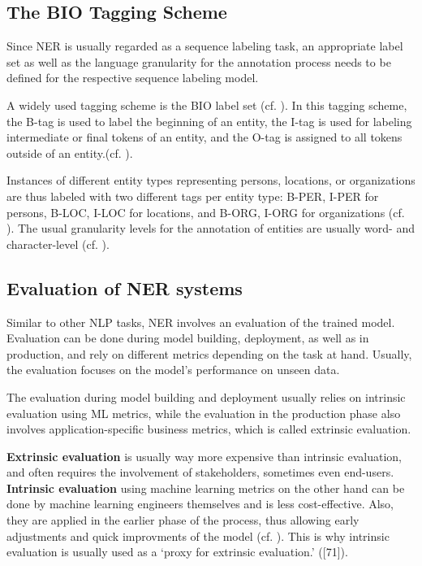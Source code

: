 \subsection{The BIO Tagging Scheme}
Since NER is usually regarded as a sequence labeling task, an appropriate label set as well as the language granularity for the annotation process needs to be defined for the respective sequence labeling model. 

A widely used tagging scheme is the BIO label set (cf. \cite{ramshaw-marcus-1995-text}). In this tagging scheme, the B-tag is used to label the beginning of an entity, the I-tag is used for labeling intermediate or final tokens of an entity, and the O-tag is assigned to all tokens outside of an entity.(cf. \cite[231]{zong_information_2021}). 

Instances of different entity types representing persons, locations, or organizations are thus labeled with two different tags per entity type: B-PER, I-PER for persons, B-LOC, I-LOC for locations, and B-ORG, I-ORG for organizations (cf. \cite[231-232]{zong_information_2021}). The usual granularity levels for the annotation of entities are usually word- and character-level (cf. \cite[232]{zong_information_2021}). 

\subsection{Evaluation of NER systems}
\label{evaluation_metrics}
Similar to other NLP tasks, NER involves an evaluation of the trained model. Evaluation can be done during model building, deployment, as well as in production, and rely on different metrics depending on the task at hand. Usually, the evaluation focuses on the model's performance on unseen data.

The evaluation during model building and deployment usually relies on intrinsic evaluation using ML metrics, while the evaluation in the production phase also involves application-specific business metrics, which is called extrinsic evaluation. 

\textbf{Extrinsic evaluation} is usually way more expensive than intrinsic evaluation, and often requires the involvement of stakeholders, sometimes even end-users. \textbf{Intrinsic evaluation} using machine learning metrics on the other hand can be done by machine learning engineers themselves and is less cost-effective. Also, they are applied in the earlier phase of the process, thus allowing early adjustments and quick improvments of the model (cf. \cite[71]{vajjala_practical_2020}). This is why intrinsic evaluation is usually used as a `proxy for extrinsic evaluation.' ([71]\cite{vajjala_practical_2020}). 

